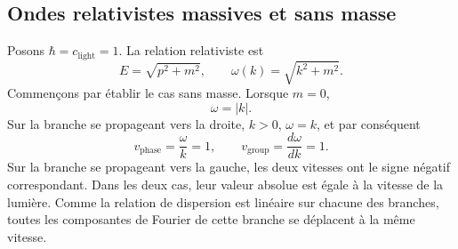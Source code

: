 \subsection{Ondes relativistes massives et sans masse}

\begin{classroomqa}
\end{classroomqa}

\begin{classroomqa}
\end{classroomqa}

Posons \(\hbar=c_{\mathrm{light}}=1\). La relation relativiste est
\begin{equation}
E=\sqrt{p^2+m^2},
\qquad
\omega(k)=\sqrt{k^2+m^2}.
\end{equation}
Commençons par établir le cas sans masse. Lorsque \(m=0\),
\begin{equation}
\omega=|k|.
\end{equation}
Sur la branche se propageant vers la droite, \(k>0\), \(\omega=k\), et par conséquent
\begin{equation}
v_{\mathrm{phase}}=\frac{\omega}{k}=1,
\qquad
v_{\mathrm{group}}=\frac{d\omega}{dk}=1.
\end{equation}
Sur la branche se propageant vers la gauche, les deux vitesses ont le signe négatif correspondant. Dans les deux cas, leur valeur absolue est égale à la vitesse de la lumière. Comme la relation de dispersion est linéaire sur chacune des branches, toutes les composantes de Fourier de cette branche se déplacent à la même vitesse.

